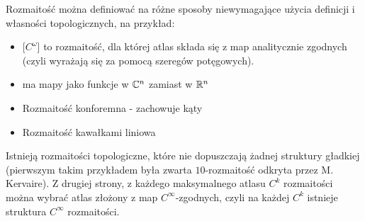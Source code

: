 Rozmaitość można definiować na różne sposoby niewymagające użycia definicji i własności topologicznych, na przykład:
\begin{itemize}
    \item {} [$C^\omega$] to rozmaitość, dla której atlas składa się z map analitycznie zgodnych (czyli wyrażają się za pomocą szeregów potęgowych).
    \item {} ma mapy jako funkcje w $\mathbb{C}^n$ zamiast w $\mathbb{R}^n$
    \item Rozmaitość konforemna - zachowuje kąty
    \item Rozmaitość kawałkami liniowa
\end{itemize}

Istnieją rozmaitości topologiczne, które nie dopuszczają żadnej struktury gładkiej (pierwszym takim przykładem była zwarta $10$-rozmaitość odkryta przez M. Kervaire). Z drugiej strony, z każdego maksymalnego atlasu $C^k$ rozmaitości można wybrać atlas złożony z map $C^\infty$-zgodnych, czyli na każdej $C^k$ istnieje struktura $C^\infty$ rozmaitości.

